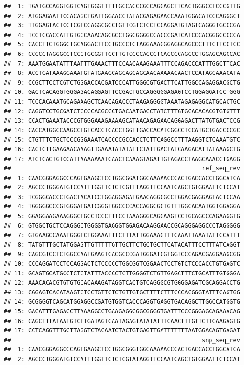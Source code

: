 \documentclass[a4paper,10pt]{article}\usepackage[]{graphicx}\usepackage[]{color}
\makeatletter
\newenvironment{kframe}{%
 \def\at@end@of@kframe{}%
 \ifinner\ifhmode%
  \def\at@end@of@kframe{\end{minipage}}%
  \begin{minipage}{\columnwidth}%
 \fi\fi%
 \def\FrameCommand##1{\hskip\@totalleftmargin \hskip-\fboxsep
 \colorbox{shadecolor}{##1}\hskip-\fboxsep
     \hskip-\linewidth \hskip-\@totalleftmargin \hskip\columnwidth}%
 \MakeFramed {\advance\hsize-\width
   \@totalleftmargin\z@ \linewidth\hsize
   \@setminipage}}%
 {\par\unskip\endMakeFramed%
 \at@end@of@kframe}
\newenvironment{knitrout}{}{} %
\makeatother
\begin{document}
\begin{knitrout}
\begin{kframe}
\begin{verbatim}
##  1: TGATGCCAGGTGGTCAGTGGGTTTTTGCCACCCGCCAGGAGCTTCACTGGGCCTCCCGTTG
##  2: ATGGAGAATTCCACAGCTGATTGGAACCTATACGAGAGAACCAAATGGACATCCCAGGGCT
##  3: TTGGAGTACTCCTCGTCCAGGCGCCTGTTCGTCTCCTCCAGGATGTAGTCAGGGTGCCCGA
##  4: TCCTCCACCATTGTGCCAAACAGCGCCTGGCGGGGCCACCCGATCATCCCACGGGCCCCCA
##  5: CACCTTCTGGGCTGCAGGACTTCCTGCCCTCTAGGAAAGGGAGGCAGCCCTTTCTTCCTCC
##  6: CCCCCTAGGGCCTCCCTGCGGTTCCTTGTCCCCACCCTCACCCCAGCCCTGGAGCAGCCAC
##  7: AAATGGAATATTTAATTTGAAACTTTCCAACAAAGAAATTTCCAGACCCATTTGGCTTCAC
##  8: ACCTGATAAAGGAAATGTATGAAGCAGCAGCAGCAACAAAAACAACTCCATAGCAAACATA
##  9: CCGCTTCCTCGTCTGGGACCACGATCCCATTGGGCGTGACTTCATTGGCCAGAGGACGCTG
## 10: GACTCACAGGTGGGAGACAGGAGTTCCGACTGCCAGGGGGAGAGTCCTGGAGGATCCTGGG
## 11: TCCCACAAATGCAGAAAGCTCAACAGACCCTAAGAGGGGTAAATAGAGAGGCATGCACTGC
## 12: CAGGTCCTGCGATCTCCCCACGCCCTGACAATGACCTATCTTTGTGCACACACGTGTGTTT
## 13: CCACTGAAATACCCGTGGGAAAGAAAAGCATAACAGAGAACAGGAGACTTATGTGACTCCG
## 14: CACCATGGCCAAGCCTGTCACCTCACCTGGTTGACCACATCGGCCTCCATGCTGACCCCGC
## 15: CTGTTTCTGCTCCCGGGAAATCACCCCGCCACCTCTTCAGGCCTTTAAGGTCTCAAATGTC
## 16: CACTCTTGAAGAACAAAGTTGAAATATATATTCTATTGACTATCAAGACATTATAAAGCTG
## 17: ATCTCACTGTCCATTAAAAAAATCAACTCAAAGTAGATTGTAGACCTAAGCAAACCTGAGG
##                                                       ref_seq_rev
##  1: CAACGGGAGGCCCAGTGAAGCTCCTGGCGGATGGCAAAAACCCACTGACCACCTGGCATCA
##  2: AGCCCTGGGATGTCCATTTGGTTCTCTCGTTTAGGTTCCAATCAGCTGTGGAATTCTCCAT
##  3: TCGGGCACCCTGACTACATCCTGGAGGAGATGAACAGGCGCCTGGACGAGGAGTACTCCAA
##  4: TGGGGGCCCGTGGGATGATCGGGTGGCCCCACCAGGCGCTGTTTGGCACAATGGTGGAGGA
##  5: GGAGGAAGAAAGGGCTGCCTCCCTTTCCTAAAGGGCAGGAAGTCCTGCAGCCCAGAAGGTG
##  6: GTGGCTGCTCCAGGGCTGGGGTGAGGGTGGAGACAAGGAACCGCAGGGAGGCCCTAGGGGG
##  7: GTGAAGCCAAATGGGTCTGGAAATTTCTTTATTGGAAAGTTTCAAATTAAATATTCCATTT
##  8: TATGTTTGCTATGGAGTTGTTTTTGTTGCTTCTGCTGCTTCATACATTTCCTTTATCAGGT
##  9: CAGCGTCCTCTGGCCAATGAAGTCACGCCCGATGGGATCGTGGTCCCAGACGAGGAAGCGG
## 10: CCCAGGATCCTCCAGGACTCTCCCCCTGGCGGTCGGAACTCCTGTCTCCCACCTGTGAGTC
## 11: GCAGTGCATGCCTCTCTATTTACCCCTCTTGGGGTCTGTTGAGCTTTCTGCATTTGTGGGA
## 12: AAACACACGTGTGTGCACAAAGATAGGTCACTGTCAGGGCGTGGGGAGATCGCAGGACCTG
## 13: CGGAGTCACATAAGTCTCCTGTTCTCTGTTGTGCTTTTCTTTCCCACGGGTATTTCAGTGG
## 14: GCGGGGTCAGCATGGAGGCCGATGTGGTCACCCAGGTGAGGTGACAGGCTTGGCCATGGTG
## 15: GACATTTGAGACCTTAAAGGCCTGAAGAGGCGGCGGGGTGATTTCCCGGGAGCAGAAACAG
## 16: CAGCTTTATAATGTCTTGATAGTCAATAGAGTATATATTTCAACTTTGTTCTTCAAGAGTG
## 17: CCTCAGGTTTGCTTAGGTCTACAATCTACTGTGAGTTGATTTTTTTAATGGACAGTGAGAT
##                                                       snp_seq_rev
##  1: CAACGGGAGGCCCAGTGAAGCTCCTGGCGGGTGGCAAAAACCCACTGACCACCTGGCATCA
##  2: AGCCCTGGGATGTCCATTTGGTTCTCTCGTATAGGTTCCAATCAGCTGTGGAATTCTCCAT

\end{verbatim}
\end{kframe}
\end{knitrout}
\end{document}
